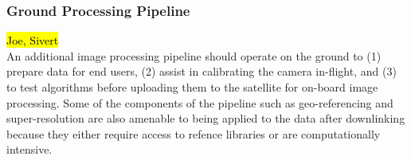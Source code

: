 \subsubsection{Ground Processing Pipeline}
\hl{Joe, Sivert \\}
An additional image processing pipeline should operate on the ground to (1) prepare data for end users, (2) assist in calibrating the camera in-flight, and (3) to test algorithms before uploading them to the satellite for on-board image processing. 
Some of the components of the pipeline such as geo-referencing and super-resolution are also amenable to being applied to the data after downlinking because they either require access to refence libraries or are computationally intensive.




























